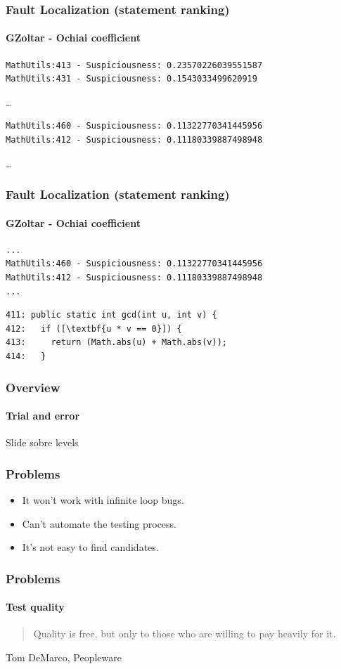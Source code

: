 \documentclass[onlymath]{beamer}
\begin{document}
\begin{frame}[fragile]
\frametitle{Fault Localization (statement ranking)}
\framesubtitle{GZoltar - Ochiai coefficient}
\begin{verbatim}
MathUtils:413 - Suspiciousness: 0.23570226039551587
MathUtils:431 - Suspiciousness: 0.1543033499620919
\end{verbatim}
\dots
\begin{verbatim}
MathUtils:460 - Suspiciousness: 0.11322770341445956
MathUtils:412 - Suspiciousness: 0.11180339887498948
\end{verbatim}
\dots
\end{frame}


\begin{frame}[fragile]
\frametitle{Fault Localization (statement ranking)}
\framesubtitle{GZoltar - Ochiai coefficient}
\begin{verbatim}
...
MathUtils:460 - Suspiciousness: 0.11322770341445956
MathUtils:412 - Suspiciousness: 0.11180339887498948
...
\end{verbatim}

\begin{lstlisting}[escapeinside=\[\]]
411: public static int gcd(int u, int v) {
412:   if ([\textbf{u * v == 0}]) {
413:     return (Math.abs(u) + Math.abs(v));
414:   }
\end{lstlisting}
\end{frame}


\frame
{
    \frametitle{Overview}
    \framesubtitle{Trial and error}
  \begin{center}
  
  \end{center}
}





\begin{frame}
Slide sobre levels
\end{frame}

  \frame
  {
    \frametitle{Problems}
\begin{itemize}
\item It won't work with infinite loop bugs.
\item Can't automate the testing process.
\item It's not easy to find candidates.
\end{itemize}    
  }

  \frame
  {
    \frametitle{Problems}
    \framesubtitle{Test quality}
   \begin{quote}
    Quality is free, but only to those who are willing to pay heavily for it.
   \end{quote}
    Tom DeMarco, Peopleware   
  }
  
\end{document}
